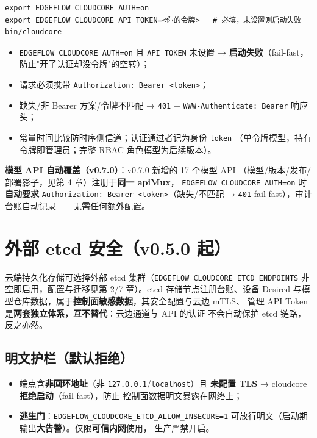 \begin{lstlisting}
export EDGEFLOW_CLOUDCORE_AUTH=on
export EDGEFLOW_CLOUDCORE_API_TOKEN=<你的令牌>   # 必填，未设置则启动失败
bin/cloudcore
\end{lstlisting}

\begin{itemize}
  \item \texttt{EDGEFLOW\_CLOUDCORE\_AUTH=on} 且 \texttt{API\_TOKEN} 未设置
        → \textbf{启动失败}（fail-fast，防止"开了认证却没令牌"的空转）；
  \item 请求必须携带 \texttt{Authorization: Bearer <token>}；
  \item 缺失/非 Bearer 方案/令牌不匹配 → \texttt{401} +
        \texttt{WWW-Authenticate: Bearer} 响应头；
  \item 常量时间比较防时序侧信道；认证通过者记为身份 \texttt{token}
        （单令牌模型，持有令牌即管理员；完整 RBAC 角色模型为后续版本）。
\end{itemize}

\textbf{模型 API 自动覆盖（v0.7.0）}：v0.7.0 新增的 17 个模型 API
（模型/版本/发布/部署影子，见第 4 章）注册于\textbf{同一 apiMux}，
\texttt{EDGEFLOW\_CLOUDCORE\_AUTH=on} 时\textbf{自动要求}
\texttt{Authorization: Bearer <token>}（缺失/不匹配 → \texttt{401}
fail-fast），审计台账自动记录——无需任何额外配置。

\section{外部 etcd 安全（v0.5.0 起）}

云端持久化存储可选择外部 etcd 集群（\texttt{EDGEFLOW\_CLOUDCORE\_ETCD\_ENDPOINTS}
非空即启用，配置与迁移见第 2/7 章）。etcd 存储节点注册台账、设备 Desired
与模型仓库数据，属于\textbf{控制面敏感数据}，其安全配置与云边 mTLS、
管理 API Token 是\textbf{两套独立体系，互不替代}：云边通道与 API 的认证
不会自动保护 etcd 链路，反之亦然。

\subsection{明文护栏（默认拒绝）}

\begin{itemize}
  \item 端点含\textbf{非回环地址}（非 \texttt{127.0.0.1}/\texttt{localhost}）且
        \textbf{未配置 TLS} → cloudcore \textbf{拒绝启动}（fail-fast），防止
        控制面数据明文暴露在网络上；
  \item \textbf{逃生门}：\texttt{EDGEFLOW\_CLOUDCORE\_ETCD\_ALLOW\_INSECURE=1}
        可放行明文（启动期输出\textbf{大告警}）。仅限\textbf{可信内网}使用，
        生产严禁开启。
\end{itemize}

